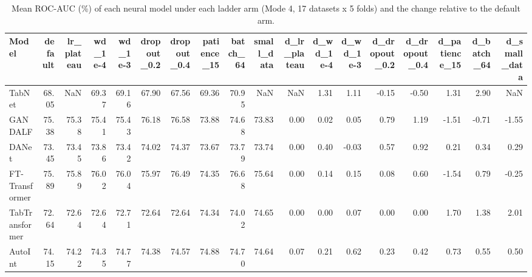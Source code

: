 \begin{table}
\caption{Mean ROC-AUC (\%) of each neural model under each ladder arm (Mode 4, 17 datasets x 5 folds) and the change relative to the default arm.}
\label{tab:r32_ladder_models}
\begin{tabular}{lrrrrrrrrrrrrrrrrr}
\toprule
Model & default & lr\_plateau & wd\_1e-4 & wd\_1e-3 & dropout\_0.2 & dropout\_0.4 & patience\_15 & batch\_64 & small\_data & d\_lr\_plateau & d\_wd\_1e-4 & d\_wd\_1e-3 & d\_dropout\_0.2 & d\_dropout\_0.4 & d\_patience\_15 & d\_batch\_64 & d\_small\_data \\
\midrule
TabNet & 68.05 & NaN & 69.37 & 69.16 & 67.90 & 67.56 & 69.36 & 70.95 & NaN & NaN & 1.31 & 1.11 & -0.15 & -0.50 & 1.31 & 2.90 & NaN \\
GANDALF & 75.38 & 75.38 & 75.41 & 75.43 & 76.18 & 76.58 & 73.88 & 74.68 & 73.83 & 0.00 & 0.02 & 0.05 & 0.79 & 1.19 & -1.51 & -0.71 & -1.55 \\
DANet & 73.45 & 73.45 & 73.86 & 73.42 & 74.02 & 74.37 & 73.67 & 73.79 & 73.74 & 0.00 & 0.40 & -0.03 & 0.57 & 0.92 & 0.21 & 0.34 & 0.29 \\
FT-Transformer & 75.89 & 75.89 & 76.02 & 76.04 & 75.97 & 76.49 & 74.35 & 76.68 & 75.64 & 0.00 & 0.14 & 0.15 & 0.08 & 0.60 & -1.54 & 0.79 & -0.25 \\
TabTransformer & 72.64 & 72.64 & 72.64 & 72.71 & 72.64 & 72.64 & 74.34 & 74.02 & 74.65 & 0.00 & 0.00 & 0.07 & 0.00 & 0.00 & 1.70 & 1.38 & 2.01 \\
AutoInt & 74.15 & 74.22 & 74.35 & 74.77 & 74.38 & 74.57 & 74.88 & 74.70 & 74.64 & 0.07 & 0.21 & 0.62 & 0.23 & 0.42 & 0.73 & 0.55 & 0.50 \\
\bottomrule
\end{tabular}
\end{table}
